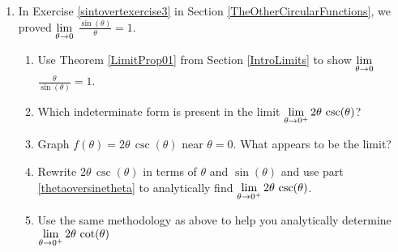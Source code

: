 \begin{enumerate}
\setcounter{enumi}{\value{HW}}

\item  In Exercise \ref{sintovertexercise3} in Section \ref{TheOtherCircularFunctions}, we proved $\displaystyle{\lim_{\theta \rightarrow 0}}$ $\frac{\sin(\theta)}{\theta} = 1$.

\begin{enumerate}

\item \label{thetaoversinetheta} Use Theorem \ref{LimitProp01} from Section \ref{IntroLimits} to show  $\displaystyle{\lim_{\theta \rightarrow 0}}$ $\frac{\theta}{\sin(\theta)} = 1$.

\smallskip


\item  Which indeterminate form is present in the limit $\displaystyle{\lim_{\theta \rightarrow 0^{+}} 2 \theta \, \csc(\theta)}$?

\smallskip

\item  Graph $f(\theta) = 2 \theta \, \csc(\theta)$ near $\theta = 0$.  What appears to be the limit?

\smallskip

\item  Rewrite $2 \theta \, \csc(\theta)$ in terms of $\theta$ and $\sin(\theta)$ and use part \ref{thetaoversinetheta} to analytically find $\displaystyle{\lim_{\theta \rightarrow 0^{+}} 2 \theta \, \csc(\theta)}$.

\item  Use the same methodology as above  to help you analytically determine $\displaystyle{\lim_{\theta \rightarrow 0^{+}} 2 \theta \, \cot(\theta)}$

\end{enumerate}

\setcounter{HW}{\value{enumi}}
\end{enumerate}


